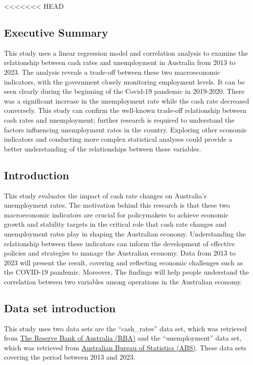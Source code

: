 \documentclass[11pt,a4paper,]{article}
\begin{document}
<<<<<<< HEAD
\hypertarget{executive-summary-1}{%
\subsection{Executive Summary}\label{executive-summary-1}}

This study uses a linear regression model and correlation analysis to examine the relationship between cash rates and unemployment in Australia from 2013 to 2023. The analysis reveals a trade-off between these two macroeconomic indicators, with the government closely monitoring employment levels. It can be seen clearly during the beginning of the Covid-19 pandemic in 2019-2020. There was a significant increase in the unemployment rate while the cash rate decreased conversely. This study can confirm the well-known trade-off relationship between cash rates and unemployment; further research is required to understand the factors influencing unemployment rates in the country. Exploring other economic indicators and conducting more complex statistical analyses could provide a better understanding of the relationships between these variables.

\hypertarget{introduction-1}{%
\subsection{Introduction}\label{introduction-1}}

This study evaluates the impact of cash rate changes on Australia's unemployment rates. The motivation behind this research is that these two macroeconomic indicators are crucial for policymakers to achieve economic growth and stability targets in the critical role that cash rate changes and unemployment rates play in shaping the Australian economy. Understanding the relationship between these indicators can inform the development of effective policies and strategies to manage the Australian economy. Data from 2013 to 2023 will present the result, covering and reflecting economic challenges such as the COVID-19 pandemic. Moreover, The findings will help people understand the correlation between two variables among operations in the Australian economy.

\hypertarget{data-set-introduction}{%
\subsection{Data set introduction}\label{data-set-introduction}}

This study uses two data sets are the ``cash\_rates'' data set, which was retrieved from \href{https://www.rba.gov.au/statistics/cash-rate/}{The Reserve Bank of Australia (RBA)}
and the ``unemployment'' data set, which was retrieved from \href{https://www.abs.gov.au/statistics/labour/employment-and-unemployment/labour-force-australia/latest-release}{Australian Bureau of Statistics (ABS)}. These data sets covering the period between 2013 and 2023.
\end{document}
